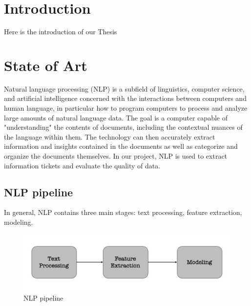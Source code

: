 \documentclass[a4paper,12pt]{report}
\begin{document}
    \setcounter{page}{1}
    \tableofcontents


    \chapter{Introduction}
    Here is the introduction of our Thesis

    \chapter{State of Art}
    Natural language processing (NLP) is a subfield of linguistics, computer science, and artificial intelligence concerned with the interactions between computers and human language, in particular how to program computers to process and analyze large amounts of natural language data. The goal is a computer capable of "understanding" the contents of documents, including the contextual nuances of the language within them. The technology can then accurately extract information and insights contained in the documents as well as categorize and organize the documents themselves.
    In our project, NLP is used to extract information tickets and evaluate the quality of data.

    \section{NLP pipeline}
    In general, NLP contains three main stages: text processing, feature extraction, modeling.
    
    \begin{figure}[h]
        \includegraphics[scale=0.18]{nlp_pipeline.png}
        \centering
        \caption{NLP pipeline}
    \end{figure}
\end{document}

